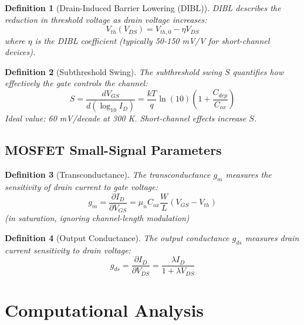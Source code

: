 \documentclass[a4paper, 11pt]{article}
\newtheorem{definition}{Definition}[section]
\begin{document}
\begin{definition}[Drain-Induced Barrier Lowering (DIBL)]
DIBL describes the reduction in threshold voltage as drain voltage increases:
\begin{equation}
V_{th}(V_{DS}) = V_{th,0} - \eta V_{DS}
\end{equation}
where $\eta$ is the DIBL coefficient (typically 50-150 mV/V for short-channel devices).
\end{definition}

\begin{definition}[Subthreshold Swing]
The subthreshold swing $S$ quantifies how effectively the gate controls the channel:
\begin{equation}
S = \frac{d V_{GS}}{d(\log_{10} I_D)} = \frac{kT}{q}\ln(10)\left(1 + \frac{C_{dep}}{C_{ox}}\right)
\end{equation}
Ideal value: 60 mV/decade at 300 K. Short-channel effects increase $S$.
\end{definition}

\subsection{MOSFET Small-Signal Parameters}

\begin{definition}[Transconductance]
The transconductance $g_m$ measures the sensitivity of drain current to gate voltage:
\begin{equation}
g_m = \frac{\partial I_D}{\partial V_{GS}} = \mu_n C_{ox} \frac{W}{L}(V_{GS} - V_{th})
\end{equation}
(in saturation, ignoring channel-length modulation)
\end{definition}

\begin{definition}[Output Conductance]
The output conductance $g_{ds}$ measures drain current sensitivity to drain voltage:
\begin{equation}
g_{ds} = \frac{\partial I_D}{\partial V_{DS}} = \frac{\lambda I_D}{1 + \lambda V_{DS}}
\end{equation}
\end{definition}

\section{Computational Analysis}
\end{document}
